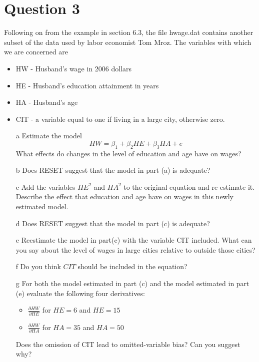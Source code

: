 \documentclass[xcolor={dvipsnames}]{beamer}
\begin{document}
	\section{Question 3}
\begin{frame}[allowframebreaks]{6.14}
	Following on from the example in section 6.3, the file hwage.dat contains another subset of the data used by labor economist Tom Mroz. The variables with which we are concerned are \begin{itemize} 
		\item HW - Husband's wage in 2006 dollars
		\item HE - Husband's education attainment in years
		\item HA - Husband's age
		\item CIT - a variable equal to one if living in a large city, otherwise zero.
		\end{itemize}
	
	\begin{itemize}
		\item[a] Estimate the model $$HW = \beta_1 + \beta_2 HE + \beta_3HA + e$$ What effects do changes in the level of education and age have on wages?
	

	\item[b] Does RESET suggest that the model in part (a) is adequate?
	
	\item[c] Add the variables $HE^2$ and $HA^2$ to the original equation and re-estimate it. Describe the effect that education and age have on wages in this newly estimated model. 
	
	\item[d] Does RESET suggest that the model in part (c) is adequate?
	\item[e] Reestimate the model in part(c) with the variable CIT included. What can you say about the level of wages in large cities relative to outside those cities?
	
	\item[f] Do you think $CIT$ should be included in the equation?
	
	\item[g] For both the model estimated in part (c) and the model estimated in part (e) evaluate the following four derivatives:
	
	\begin{itemize}
		\item $\frac{\partial HW}{\partial HE} $ for $HE = 6$ and $HE = 15$
		\item $\frac{\partial HW}{\partial HA} $ for $HA = 35$ and $HA = 50$
	\end{itemize}
Does the omission of CIT lead to omitted-variable bias? Can you suggest why?
\end{itemize}

\end{frame}
\end{document}

